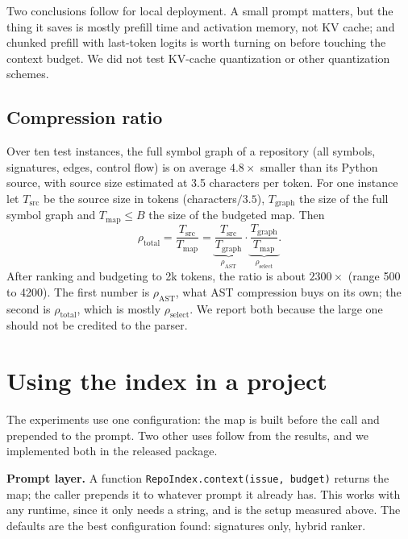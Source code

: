 \documentclass[10pt]{article}
\begin{document}
Two conclusions follow for local deployment. A small prompt matters, but the thing it saves is mostly prefill time and activation memory, not KV cache; and chunked prefill with last-token logits is worth turning on before touching the context budget. We did not test KV-cache quantization or other quantization schemes.

\subsection{Compression ratio}
Over ten test instances, the full symbol graph of a repository (all symbols, signatures, edges, control flow) is on average $4.8\times$ smaller than its Python source, with source size estimated at 3.5 characters per token. For one instance let $T_{\mathrm{src}}$ be the source size in tokens (characters$/3.5$), $T_{\mathrm{graph}}$ the size of the full symbol graph and $T_{\mathrm{map}}\le B$ the size of the budgeted map. Then
\begin{equation}\label{eq:cr}
\rho_{\mathrm{total}}=\frac{T_{\mathrm{src}}}{T_{\mathrm{map}}}=\underbrace{\frac{T_{\mathrm{src}}}{T_{\mathrm{graph}}}}_{\rho_{\mathrm{AST}}}\cdot\underbrace{\frac{T_{\mathrm{graph}}}{T_{\mathrm{map}}}}_{\rho_{\mathrm{select}}}.
\end{equation} After ranking and budgeting to 2k tokens, the ratio is about $2300\times$ (range 500 to 4200). The first number is $\rho_{\mathrm{AST}}$, what AST compression buys on its own; the second is $\rho_{\mathrm{total}}$, which is mostly $\rho_{\mathrm{select}}$. We report both because the large one should not be credited to the parser.

\section{Using the index in a project}
The experiments use one configuration: the map is built before the call and prepended to the prompt. Two other uses follow from the results, and we implemented both in the released package.

\textbf{Prompt layer.} A function \texttt{RepoIndex.context(issue, budget)} returns the map; the caller prepends it to whatever prompt it already has. This works with any runtime, since it only needs a string, and is the setup measured above. The defaults are the best configuration found: signatures only, hybrid ranker.
\end{document}
